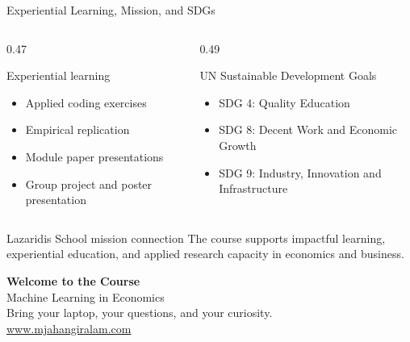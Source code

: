 \documentclass[aspectratio=169,11pt]{beamer}
\begin{document}
\begin{frame}{Experiential Learning, Mission, and SDGs}
\begin{columns}[T,onlytextwidth]
\begin{column}{0.47\textwidth}
\begin{block}{Experiential learning}
\begin{itemize}
    \item Applied coding exercises
    \item Empirical replication
    \item Module paper presentations
    \item Group project and poster presentation
\end{itemize}
\end{block}
\end{column}
\begin{column}{0.49\textwidth}
\begin{block}{UN Sustainable Development Goals}
\begin{itemize}
    \item SDG 4: Quality Education
    \item SDG 8: Decent Work and Economic Growth
    \item SDG 9: Industry, Innovation and Infrastructure
\end{itemize}
\end{block}
\end{column}
\end{columns}

\vspace{0.3em}
\begin{block}{Lazaridis School mission connection}
The course supports impactful learning, experiential education, and applied research capacity in economics and business.
\end{block}
\end{frame}

\begin{frame}[plain]
\begin{center}
\vspace{1.0cm}
{\Huge \textbf{Welcome to the Course}}\\[0.7em]
{\Large Machine Learning in Economics}\\[1.2em]
{\normalsize Bring your laptop, your questions, and your curiosity.}\\[1.2em]
\href{https://www.mjahangiralam.com}{www.mjahangiralam.com}
\end{center}
\end{frame}
\end{document}
